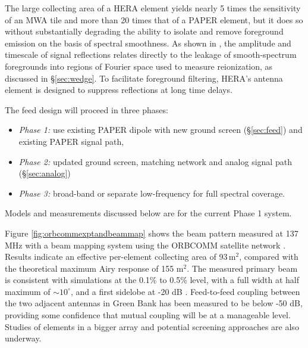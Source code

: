 \documentclass[preprint,11pt]{aastex}
\newcommand{\Mycitet}[1]{\citet{#1}}
\newcommand{\Mycitep}[1]{\citep{#1}}
\begin{document}
The large collecting area of a HERA element yields nearly 5 times the sensitivity of an MWA tile and more
than 20 times that of a PAPER element, but it does so without substantially
degrading the ability to isolate and remove foreground emission on the basis of
spectral smoothness.  As shown in
\Mycitet{parsons_et_al2012b}, the amplitude and timescale of signal reflections
relates directly to the leakage of smooth-spectrum foregrounds into regions of Fourier space 
used to measure reionization, as discussed in \S\ref{sec:wedge}.
To facilitate foreground filtering, HERA's antenna element is designed to suppress reflections at long time delays.

The feed design will proceed in three phases:
\begin{itemize}
\item {\em Phase 1:}  use existing PAPER dipole with new ground screen (\S\ref{sec:feed}) and existing PAPER signal path,
\item {\em Phase 2:}  updated ground screen, matching network and analog signal path (\S\ref{sec:analog})
\item {\em Phase 3:}  broad-band or separate low-frequency for full spectral coverage.
\end{itemize}
Models and measurements discussed below are for the current Phase 1 system.



Figure \ref{fig:orbcommexptandbeammap} shows the beam pattern measured at 137 MHz with a beam mapping
system using the ORBCOMM satellite network \Mycitep{neben_et_al2016}.  Results
indicate an effective per-element collecting area of 93\,m$^2$, compared with the
theoretical maximum Airy response of 155 m$^2$.  The measured primary beam is
consistent with simulations at the 0.1\% to 0.5\% level, with a full width at
half maximum of $\sim$$10^\circ$, and a first sidelobe at -20 dB \citep{ewallwice_et_al2016,neben_et_al2016,patra_et_al2016,thyagarajan_et_al2016}.
Feed-to-feed coupling between the two adjacent antennas in Green Bank has been measured to be below -50 dB, providing some confidence that mutual coupling will be at a 
manageable level.  Studies of elements in a bigger array and potential screening approaches are also underway.
\end{document}
